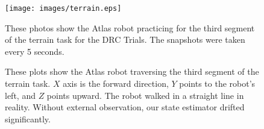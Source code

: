 \documentclass{ws-ijhr}
\begin{document}
\begin{figure}
  \begin{center}
    {\texttt{[image: images/terrain.eps]}}
    \caption{
      These photos show the Atlas robot practicing for the third segment of the 
      terrain task for the DRC Trials. The snapshots were taken every 5 seconds.
      }\label{fig:terrain_pic} 
  \end{center}
\end{figure}

\begin{figure}
  \begin{center}
    \caption{                    
      These plots show the Atlas robot traversing the third segment of the terrain 
      task. 
      $X$ axis is the forward direction, $Y$ points to the robot's left, and
      $Z$ points upward. 
      The robot walked in a straight line in reality. 
			Without external observation, our state estimator drifted significantly.
			}\label{fig:walk_com} 
  \end{center}
\end{figure}     
\end{document}
